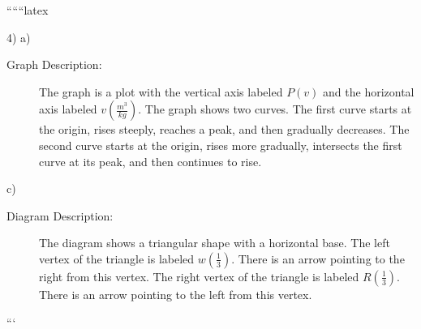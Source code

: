 
``````latex


4) a)

\begin{description}
    \item[Graph Description:] The graph is a plot with the vertical axis labeled \( P(v) \) and the horizontal axis labeled \( v \left( \frac{m^3}{kg} \right) \). The graph shows two curves. The first curve starts at the origin, rises steeply, reaches a peak, and then gradually decreases. The second curve starts at the origin, rises more gradually, intersects the first curve at its peak, and then continues to rise.
\end{description}

c)

\begin{description}
    \item[Diagram Description:] The diagram shows a triangular shape with a horizontal base. The left vertex of the triangle is labeled \( w \left( \frac{1}{3} \right) \). There is an arrow pointing to the right from this vertex. The right vertex of the triangle is labeled \( R \left( \frac{1}{3} \right) \). There is an arrow pointing to the left from this vertex.
\end{description}

```